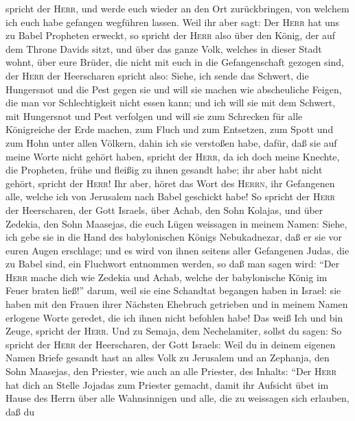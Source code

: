 spricht der \textsc{Herr}, und werde euch wieder an den Ort
zurückbringen, von welchem ich euch habe gefangen wegführen lassen.
 Weil ihr aber sagt: Der \textsc{Herr} hat uns zu Babel
Propheten erweckt,  so spricht der \textsc{Herr} also
über den König, der auf dem Throne Davids sitzt, und über das ganze
Volk, welches in dieser Stadt wohnt, über eure Brüder, die nicht mit
euch in die Gefangenschaft gezogen sind,  der
\textsc{Herr} der Heerscharen spricht also: Siehe, ich sende das
Schwert, die Hungersnot und die Pest gegen sie und will sie machen wie
abscheuliche Feigen, die man vor Schlechtigkeit nicht essen kann;
 und ich will sie mit dem Schwert, mit Hungersnot und
Pest verfolgen und will sie zum Schrecken für alle Königreiche der Erde
machen, zum Fluch und zum Entsetzen, zum Spott und zum Hohn unter allen
Völkern, dahin ich sie verstoßen habe,  dafür, daß sie
auf meine Worte nicht gehört haben, spricht der \textsc{Herr}, da ich
doch meine Knechte, die Propheten, frühe und fleißig zu ihnen gesandt
habe; ihr aber habt nicht gehört, spricht der \textsc{Herr}!
 Ihr aber, höret das Wort des \textsc{Herrn}, ihr
Gefangenen alle, welche ich von Jerusalem nach Babel geschickt habe!
 So spricht der \textsc{Herr} der Heerscharen, der Gott
Israels, über Achab, den Sohn Kolajas, und über Zedekia, den Sohn
Maasejas, die euch Lügen weissagen in meinem Namen: Siehe, ich gebe sie
in die Hand des babylonischen Königs Nebukadnezar, daß er sie vor euren
Augen erschlage;  und es wird von ihnen seitens aller
Gefangenen Judas, die zu Babel sind, ein Fluchwort entnommen werden, so
daß man sagen wird: ``Der \textsc{Herr} mache dich wie Zedekia und
Achab, welche der babylonische König im Feuer braten ließ!''
 darum, weil sie eine Schandtat begangen haben in Israel:
sie haben mit den Frauen ihrer Nächsten Ehebruch getrieben und in meinem
Namen erlogene Worte geredet, die ich ihnen nicht befohlen habe! Das
weiß Ich und bin Zeuge, spricht der \textsc{Herr}.  Und
zu Semaja, dem Nechelamiter, sollst du sagen:  So spricht
der \textsc{Herr} der Heerscharen, der Gott Israels: Weil du in deinem
eigenen Namen Briefe gesandt hast an alles Volk zu Jerusalem und an
Zephanja, den Sohn Maasejas, den Priester, wie auch an alle Priester,
des Inhalts:  ``Der \textsc{Herr} hat dich an Stelle
Jojadas zum Priester gemacht, damit ihr Aufsicht übet im Hause des Herrn
über alle Wahnsinnigen und alle, die zu weissagen sich erlauben, daß du
